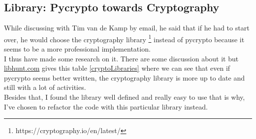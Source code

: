 \documentclass{eplmastersthesis}
\begin{document}
\subsection{Library: Pycrypto towards Cryptography}
While discussing with Tim van de Kamp by email, he said that if he had to start over, he would choose the cryptography library \footnote{https://cryptography.io/en/latest/} instead of pycrypto because it seems to be a more professional implementation.\\
I thus have made some research on it. There are some discussion about it but \url{libhunt.com} gives this table \ref{cryptoLibraries} where we can see that even if pycrypto seems better written, the cryptography library is more up to date and still with a lot of activities.\\
Besides that, I found the library well defined and really easy to use that is why, I've chosen to refactor the code with this particular library instead.
\end{document}

